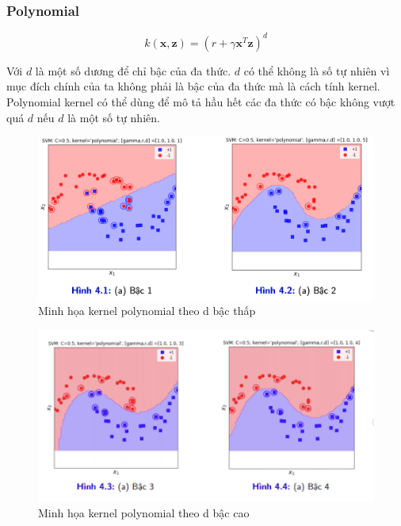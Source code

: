 \documentclass[a4paper, 12pt, oneside]{report}
\begin{document}
\subsubsection{Polynomial}
\begin{mybox}
$$k(\mathbf{x}, \mathbf{z}) = (r + \gamma \mathbf{x}^T\mathbf{z})^d$$
\end{mybox}
Với $d$ là một số dương để chỉ bậc của đa thức. $d$ có thể không là số tự nhiên vì mục đích chính của ta không phải là bậc của đa thức mà là cách tính kernel. Polynomial kernel có thể dùng để mô tả hầu hết các đa thức có bậc không vượt quá $d$ nếu $d$ là một số tự nhiên.
\begin{center}
    \begin{figure}[H]
    \begin{center}
     \includegraphics[scale=0.6]{poly12.png}
    \end{center}
    \caption{Minh họa kernel polynomial theo d bậc thấp}
    \label{Hình 4.4}
    \end{figure}
\end{center}
\begin{center}
    \begin{figure}[H]
    \begin{center}
     \includegraphics[scale=0.7]{poly1.png}
    \end{center}
    \caption{Minh họa kernel polynomial theo d bậc cao}
    \label{Hình 4.4}
    \end{figure}
\end{center}
\end{document}
